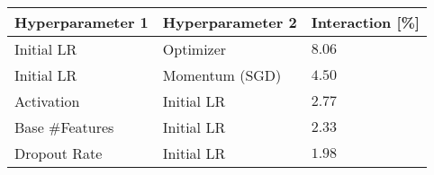 \begin{tabular}{lll}
\toprule
Hyperparameter 1 & Hyperparameter 2 & Interaction [\%] \\
\midrule
Initial LR & Optimizer & $8.06$ \\
Initial LR & Momentum (SGD) & $4.50$ \\
Activation & Initial LR & $2.77$ \\
Base #Features & Initial LR & $2.33$ \\
Dropout Rate & Initial LR & $1.98$ \\
\bottomrule
\end{tabular}

